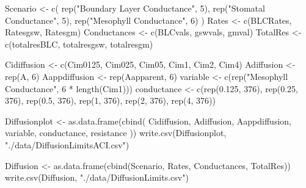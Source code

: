 \documentclass[
]{krantz}
\makeatletter
\newenvironment{Shaded}{\begin{snugshade}}{\end{snugshade}}
\newcommand{\DecValTok}[1]{\textcolor[rgb]{0.00,0.00,0.81}{#1}}
\newcommand{\FloatTok}[1]{\textcolor[rgb]{0.00,0.00,0.81}{#1}}
\newcommand{\FunctionTok}[1]{\textcolor[rgb]{0.00,0.00,0.00}{#1}}
\newcommand{\NormalTok}[1]{#1}
\newcommand{\OtherTok}[1]{\textcolor[rgb]{0.56,0.35,0.01}{#1}}
\newcommand{\SpecialCharTok}[1]{\textcolor[rgb]{0.00,0.00,0.00}{#1}}
\newcommand{\StringTok}[1]{\textcolor[rgb]{0.31,0.60,0.02}{#1}}
\newenvironment{kframe}{%
\medskip{}
\setlength{\fboxsep}{.8em}
 \def\at@end@of@kframe{}%
 \ifinner\ifhmode%
  \def\at@end@of@kframe{\end{minipage}}%
  \begin{minipage}{\columnwidth}%
 \fi\fi%
 \def\FrameCommand##1{\hskip\@totalleftmargin \hskip-\fboxsep
 \colorbox{shadecolor}{##1}\hskip-\fboxsep
     \hskip-\linewidth \hskip-\@totalleftmargin \hskip\columnwidth}%
 \MakeFramed {\advance\hsize-\width
   \@totalleftmargin\z@ \linewidth\hsize
   \@setminipage}}%
 {\par\unskip\endMakeFramed%
 \at@end@of@kframe}
\renewenvironment{Shaded}{\begin{kframe}}{\end{kframe}}
\makeatother
\begin{document}
\begin{Shaded}
\begin{Highlighting}[]
\NormalTok{Scenario }\OtherTok{\textless{}{-}}
  \FunctionTok{c}\NormalTok{(}
    \FunctionTok{rep}\NormalTok{(}\StringTok{"Boundary Layer Conductance"}\NormalTok{, }\DecValTok{5}\NormalTok{),}
    \FunctionTok{rep}\NormalTok{(}\StringTok{"Stomatal Conductance"}\NormalTok{, }\DecValTok{5}\NormalTok{),}
    \FunctionTok{rep}\NormalTok{(}\StringTok{"Mesophyll Conductance"}\NormalTok{, }\DecValTok{6}\NormalTok{)}
\NormalTok{  )}
\NormalTok{Rates }\OtherTok{\textless{}{-}} \FunctionTok{c}\NormalTok{(BLCRates, Ratesgsw, Ratesgm)}
\NormalTok{Conductances }\OtherTok{\textless{}{-}} \FunctionTok{c}\NormalTok{(BLCvals, gswvals, gmval)}
\NormalTok{TotalRes }\OtherTok{\textless{}{-}} \FunctionTok{c}\NormalTok{(totalresBLC, totalresgsw, totalresgm)}

\NormalTok{Cidiffusion }\OtherTok{\textless{}{-}} \FunctionTok{c}\NormalTok{(Cim0125, Cim025, Cim05, Cim1, Cim2, Cim4)}
\NormalTok{Adiffusion }\OtherTok{\textless{}{-}} \FunctionTok{rep}\NormalTok{(A, }\DecValTok{6}\NormalTok{)}
\NormalTok{Aappdiffusion }\OtherTok{\textless{}{-}} \FunctionTok{rep}\NormalTok{(Aapparent, }\DecValTok{6}\NormalTok{)}
\NormalTok{variable }\OtherTok{\textless{}{-}} \FunctionTok{c}\NormalTok{(}\FunctionTok{rep}\NormalTok{(}\StringTok{"Mesophyll Conductance"}\NormalTok{, }\DecValTok{6} \SpecialCharTok{*} \FunctionTok{length}\NormalTok{(Cim1)))}
\NormalTok{conductance }\OtherTok{\textless{}{-}}
  \FunctionTok{c}\NormalTok{(}\FunctionTok{rep}\NormalTok{(}\FloatTok{0.125}\NormalTok{, }\DecValTok{376}\NormalTok{),}
    \FunctionTok{rep}\NormalTok{(}\FloatTok{0.25}\NormalTok{, }\DecValTok{376}\NormalTok{),}
    \FunctionTok{rep}\NormalTok{(}\FloatTok{0.5}\NormalTok{, }\DecValTok{376}\NormalTok{),}
    \FunctionTok{rep}\NormalTok{(}\DecValTok{1}\NormalTok{, }\DecValTok{376}\NormalTok{),}
    \FunctionTok{rep}\NormalTok{(}\DecValTok{2}\NormalTok{, }\DecValTok{376}\NormalTok{),}
    \FunctionTok{rep}\NormalTok{(}\DecValTok{4}\NormalTok{, }\DecValTok{376}\NormalTok{))}


\NormalTok{Diffusionplot }\OtherTok{\textless{}{-}}
  \FunctionTok{as.data.frame}\NormalTok{(}\FunctionTok{cbind}\NormalTok{(}
\NormalTok{    Cidiffusion,}
\NormalTok{    Adiffusion,}
\NormalTok{    Aappdiffusion,}
\NormalTok{    variable,}
\NormalTok{    conductance,}
\NormalTok{    resistance}
\NormalTok{  ))}
\FunctionTok{write.csv}\NormalTok{(Diffusionplot, }\StringTok{"./data/DiffusionLimitsACI.csv"}\NormalTok{)}

\NormalTok{Diffusion }\OtherTok{\textless{}{-}}
  \FunctionTok{as.data.frame}\NormalTok{(}\FunctionTok{cbind}\NormalTok{(Scenario, Rates, Conductances, TotalRes))}
\FunctionTok{write.csv}\NormalTok{(Diffusion, }\StringTok{"./data/DiffusionLimits.csv"}\NormalTok{)}
\end{Highlighting}
\end{Shaded}
\end{document}
